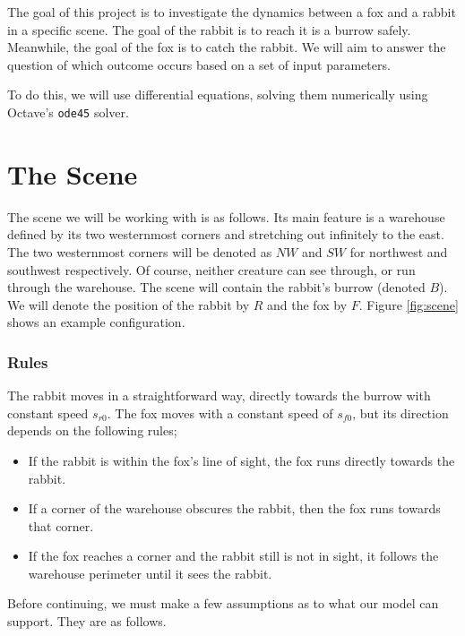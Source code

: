 The goal of this project is to investigate the dynamics between a fox and a rabbit in a specific scene. The goal of the rabbit is to reach it is a burrow safely. Meanwhile, the goal of the fox is to catch the rabbit. We will aim to answer the question of which outcome occurs based on a set of input parameters.

To do this, we will use differential equations, solving them numerically using Octave's \texttt{ode45} solver.

\section{The Scene}

The scene we will be working with is as follows. Its main feature is a warehouse defined by its two westernmost corners and stretching out infinitely to the east. The two westernmost corners will be denoted as $NW$ and $SW$ for northwest and southwest respectively. Of course, neither creature can see through, or run through the warehouse. The scene will contain the rabbit's burrow (denoted $B$). We will denote the position of the rabbit by $R$ and the fox by $F$. Figure \ref{fig:scene} shows an example configuration. 

\subsubsection{Rules} \label{sec:rules}

The rabbit moves in a straightforward way, directly towards the burrow with constant speed $s_{r0}$. The fox moves with a constant speed of $s_{f0}$, but its direction depends on the following rules;

\begin{itemize}

\item If the rabbit is within the fox's line of sight, the fox runs directly towards the rabbit.

\item If a corner of the warehouse obscures the rabbit, then the fox runs towards that corner.

\item If the fox reaches a corner and the rabbit still is not in sight, it follows the warehouse perimeter until it sees the rabbit.
\end{itemize}


Before continuing, we must make a few assumptions as to what our model can support. They are as follows.

